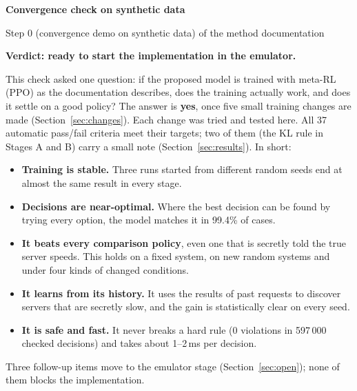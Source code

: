 \documentclass[10pt,a4paper]{article}
\begin{document}
{\sffamily\bfseries\LARGE\color{ink} Convergence check on synthetic data\par}
\vspace{2pt}
{\sffamily\color{muted} Step 0 (convergence demo on synthetic data) of the method documentation\par}
\vspace{6pt}

\begin{goodbox}
{\sffamily\bfseries\large\color{acc} Verdict: ready to start the implementation in the emulator.}\par\smallskip
This check asked one question: if the proposed model is trained with meta-RL (PPO) as the documentation describes, does the
training actually work, and does it settle on a good policy? The answer is \textbf{yes}, once five small training changes are made
(Section~\ref{sec:changes}). Each change was tried and tested here. All 37 automatic pass/fail
criteria meet their targets; two of them (the KL rule in Stages A and B) carry a small note (Section~\ref{sec:results}). In short:
\begin{itemize}
\item \textbf{Training is stable.} Three runs started from different random seeds end at almost the same result in every stage.
\item \textbf{Decisions are near-optimal.} Where the best decision can be found by trying every option, the model matches it in 99.4\% of cases.
\item \textbf{It beats every comparison policy}, even one that is secretly told the true server speeds. This holds on a fixed system, on new random systems and under four kinds of changed conditions.
\item \textbf{It learns from its history.} It uses the results of past requests to discover servers that are secretly slow, and the gain is statistically clear on every seed.
\item \textbf{It is safe and fast.} It never breaks a hard rule (0 violations in 597\,000 checked decisions) and takes about 1--2\,ms per decision.
\end{itemize}
Three follow-up items move to the emulator stage (Section~\ref{sec:open}); none of them blocks the implementation.
\end{goodbox}
\end{document}
